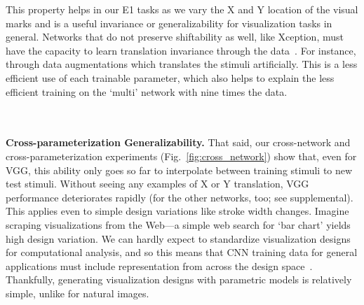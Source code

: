 {%

This property helps in our E1 tasks as we vary the X and Y location of the visual marks and is a useful invariance or generalizability for visualization tasks in general. Networks that do not preserve shiftability as well, like Xception, must have the capacity to learn translation invariance through the data~\cite{kauderer2017quantifying}. For instance, through data augmentations which translates the stimuli artificially. This is a less efficient use of each trainable parameter, which also helps to explain the less efficient training on the `multi' network with nine times the data.

%
%
\\~\\
\noindent \textbf{Cross-parameterization Generalizability.} That said, our cross-network and cross-parameterization experiments (Fig.~\ref{fig:cross_network}) show that, even for VGG, this ability only goes so far to interpolate between training stimuli to new test stimuli. Without seeing any examples of X or Y translation, VGG performance deteriorates rapidly (for the other networks, too; see supplemental). This applies even to simple design variations like stroke width changes. Imagine scraping visualizations from the Web---a simple web search for `bar chart' yields high design variation. We can hardly expect to standardize visualization designs for computational analysis, and so this means that CNN training data for general applications must include representation from across the design space~\cite{kafle2018dvqa}. Thankfully, generating visualization designs with parametric models is relatively simple, unlike for natural images.

}
